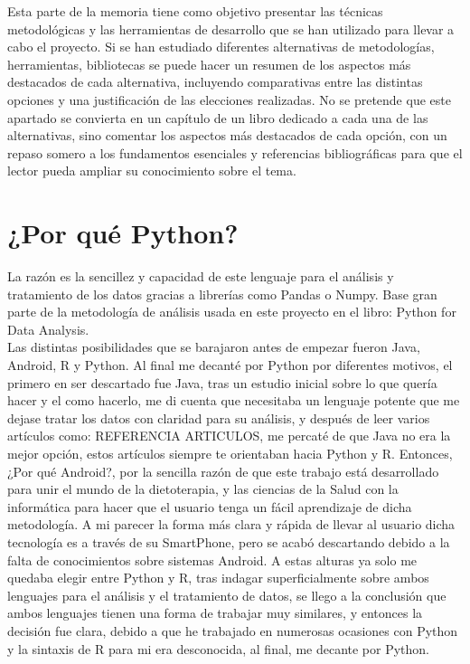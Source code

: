 
Esta parte de la memoria tiene como objetivo presentar las técnicas metodológicas y las herramientas de desarrollo que se han utilizado para llevar a cabo el proyecto. Si se han estudiado diferentes alternativas de metodologías, herramientas, bibliotecas se puede hacer un resumen de los aspectos más destacados de cada alternativa, incluyendo comparativas entre las distintas opciones y una justificación de las elecciones realizadas. 
No se pretende que este apartado se convierta en un capítulo de un libro dedicado a cada una de las alternativas, sino comentar los aspectos más destacados de cada opción, con un repaso somero a los fundamentos esenciales y referencias bibliográficas para que el lector pueda ampliar su conocimiento sobre el tema.
\section{¿Por qué Python?}
La razón es la sencillez y capacidad de este lenguaje para el análisis y tratamiento de los datos gracias a librerías como Pandas o Numpy. Base gran parte de la metodología de análisis usada en este proyecto en el libro: Python for Data Analysis.
\cite{pythonDataAnalisis}
\\ 

Las distintas posibilidades que se barajaron antes de empezar fueron Java, Android, R y Python. Al final me decanté por Python por diferentes motivos, el primero en ser descartado fue Java, tras un estudio inicial sobre lo que quería hacer y el como hacerlo, me di cuenta que necesitaba un lenguaje potente que me dejase tratar los datos con claridad para su análisis, y después de leer varios artículos como: REFERENCIA ARTICULOS, me percaté de que Java no era la mejor opción, estos artículos siempre te orientaban hacia Python y R. Entonces, ¿Por qué Android?, por la sencilla razón de que este trabajo está desarrollado para unir el mundo de la dietoterapia, y las ciencias de la Salud con la informática para hacer que el usuario tenga un fácil aprendizaje de dicha metodología. A mi parecer la forma más clara y rápida de llevar al usuario dicha tecnología es a través de su SmartPhone, pero se acabó descartando debido a la falta de conocimientos sobre sistemas Android. A estas alturas ya solo me quedaba elegir entre Python y R, tras indagar superficialmente sobre ambos lenguajes para el análisis y el tratamiento de datos, se llego a la conclusión que ambos lenguajes tienen una forma de trabajar muy similares, y entonces la decisión fue clara, debido a que he trabajado en numerosas ocasiones con Python y la sintaxis de R para mi era desconocida, al final, me decante por Python.
